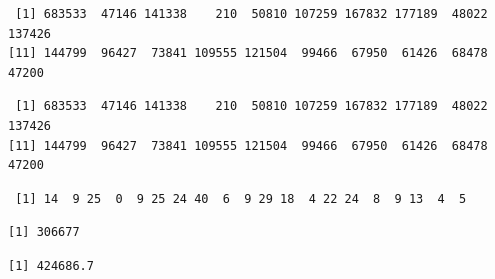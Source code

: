 \documentclass[
  letterpaper,
]{scrbook}
\newenvironment{Shaded}{\begin{snugshade}}{\end{snugshade}}
\newcommand{\DecValTok}[1]{\textcolor[rgb]{0.68,0.00,0.00}{#1}}
\newcommand{\DocumentationTok}[1]{\textcolor[rgb]{0.37,0.37,0.37}{\textit{#1}}}
\newcommand{\FunctionTok}[1]{\textcolor[rgb]{0.28,0.35,0.67}{#1}}
\newcommand{\NormalTok}[1]{\textcolor[rgb]{0.00,0.23,0.31}{#1}}
\newcommand{\SpecialCharTok}[1]{\textcolor[rgb]{0.37,0.37,0.37}{#1}}
\begin{document}
\begin{verbatim}
 [1] 683533  47146 141338    210  50810 107259 167832 177189  48022 137426
[11] 144799  96427  73841 109555 121504  99466  67950  61426  68478  47200
\end{verbatim}

\begin{Shaded}
\end{Shaded}

\begin{verbatim}
 [1] 683533  47146 141338    210  50810 107259 167832 177189  48022 137426
[11] 144799  96427  73841 109555 121504  99466  67950  61426  68478  47200
\end{verbatim}

\begin{Shaded}
\end{Shaded}

\begin{verbatim}
 [1] 14  9 25  0  9 25 24 40  6  9 29 18  4 22 24  8  9 13  4  5
\end{verbatim}

\begin{Shaded}
\end{Shaded}

\begin{verbatim}
[1] 306677
\end{verbatim}

\begin{Shaded}
\end{Shaded}

\begin{verbatim}
[1] 424686.7
\end{verbatim}
\end{document}
